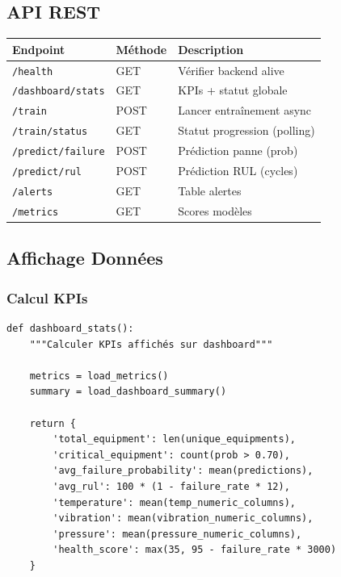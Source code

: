 \documentclass[12pt,a4paper,french]{article}
\begin{document}
\subsection{API REST}

\begin{table}[H]
\centering
\small
\begin{tabular}{|l|l|l|}
\hline
\textbf{Endpoint} & \textbf{Méthode} & \textbf{Description} \\
\hline
\texttt{/health} & GET & Vérifier backend alive \\
\texttt{/dashboard/stats} & GET & KPIs + statut globale \\
\texttt{/train} & POST & Lancer entraînement async \\
\texttt{/train/status} & GET & Statut progression (polling) \\
\texttt{/predict/failure} & POST & Prédiction panne (prob) \\
\texttt{/predict/rul} & POST & Prédiction RUL (cycles) \\
\texttt{/alerts} & GET & Table alertes \\
\texttt{/metrics} & GET & Scores modèles \\
\hline
\end{tabular}
\end{table}

\subsection{Affichage Données}

\subsubsection{Calcul KPIs}

\begin{lstlisting}
def dashboard_stats():
    """Calculer KPIs affichés sur dashboard"""
    
    metrics = load_metrics()
    summary = load_dashboard_summary()
    
    return {
        'total_equipment': len(unique_equipments),
        'critical_equipment': count(prob > 0.70),
        'avg_failure_probability': mean(predictions),
        'avg_rul': 100 * (1 - failure_rate * 12),
        'temperature': mean(temp_numeric_columns),
        'vibration': mean(vibration_numeric_columns),
        'pressure': mean(pressure_numeric_columns),
        'health_score': max(35, 95 - failure_rate * 3000)
    }
\end{lstlisting}
\end{document}
